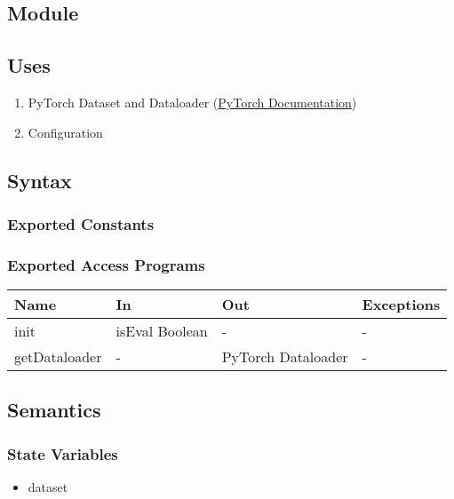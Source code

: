 \documentclass[12pt, titlepage]{article}
\begin{document}
\subsection{Module}



\subsection{Uses}
\begin{enumerate}
  \item PyTorch Dataset and Dataloader (\href{https://pytorch.org/tutorials/beginner/basics/data_tutorial.html}{PyTorch Documentation})
  \item Configuration
\end{enumerate}

\subsection{Syntax}



\subsubsection{Exported Constants}



\subsubsection{Exported Access Programs}

\begin{center}
\begin{tabular}{p{3cm}|p{5cm}|p{4cm}|p{2cm}}
\hline
\textbf{Name} & \textbf{In} & \textbf{Out} & \textbf{Exceptions} \\
\hline
init & isEval Boolean & - & - \\
\hline
getDataloader & - & PyTorch Dataloader & -  \\
\hline
\end{tabular}
\end{center}

\subsection{Semantics}

\subsubsection{State Variables}
\begin{itemize}
  \item dataset
\end{itemize}
\end{document}
